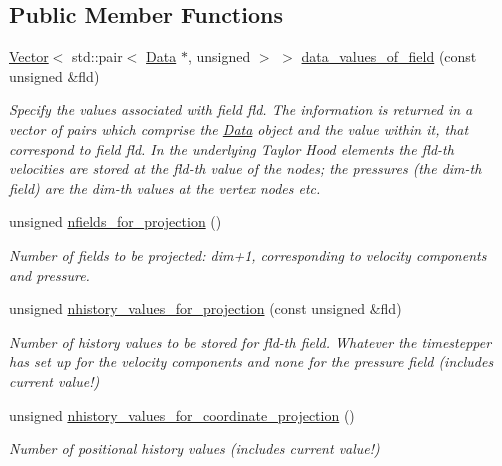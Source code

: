 \subsection*{Public Member Functions}
\begin{DoxyCompactItemize}
\item 
\hyperlink{classoomph_1_1Vector}{Vector}$<$ std\+::pair$<$ \hyperlink{classoomph_1_1Data}{Data} $\ast$, unsigned $>$ $>$ \hyperlink{classoomph_1_1GeneralisedNewtonianProjectableAxisymmetricTaylorHoodElement_a89cf2117918a1d5074e26bb386aac730}{data\+\_\+values\+\_\+of\+\_\+field} (const unsigned \&fld)
\begin{DoxyCompactList}\small\item\em Specify the values associated with field fld. The information is returned in a vector of pairs which comprise the \hyperlink{classoomph_1_1Data}{Data} object and the value within it, that correspond to field fld. In the underlying Taylor Hood elements the fld-\/th velocities are stored at the fld-\/th value of the nodes; the pressures (the dim-\/th field) are the dim-\/th values at the vertex nodes etc. \end{DoxyCompactList}\item 
unsigned \hyperlink{classoomph_1_1GeneralisedNewtonianProjectableAxisymmetricTaylorHoodElement_a0fadb5b52ae5980e6826d75e6be982b3}{nfields\+\_\+for\+\_\+projection} ()
\begin{DoxyCompactList}\small\item\em Number of fields to be projected\+: dim+1, corresponding to velocity components and pressure. \end{DoxyCompactList}\item 
unsigned \hyperlink{classoomph_1_1GeneralisedNewtonianProjectableAxisymmetricTaylorHoodElement_a128887a8ec6ac7e2054d5343e85afde1}{nhistory\+\_\+values\+\_\+for\+\_\+projection} (const unsigned \&fld)
\begin{DoxyCompactList}\small\item\em Number of history values to be stored for fld-\/th field. Whatever the timestepper has set up for the velocity components and none for the pressure field (includes current value!) \end{DoxyCompactList}\item 
unsigned \hyperlink{classoomph_1_1GeneralisedNewtonianProjectableAxisymmetricTaylorHoodElement_a43822b73b545d33e21a300247e1954b3}{nhistory\+\_\+values\+\_\+for\+\_\+coordinate\+\_\+projection} ()
\begin{DoxyCompactList}\small\item\em Number of positional history values (includes current value!) \end{DoxyCompactList}\item 

\end{DoxyCompactItemize}
